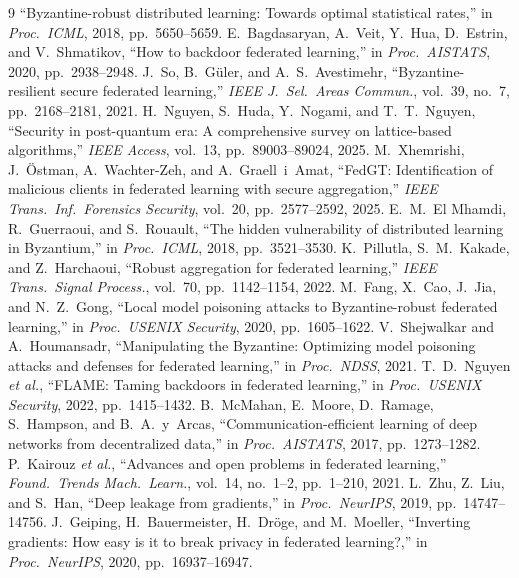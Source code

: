 \documentclass[lettersize,journal]{IEEEtran}
\begin{document}
\begin{thebibliography}{9}
``Byzantine-robust distributed learning: Towards optimal statistical rates,'' in
\emph{Proc.\ ICML}, 2018, pp.\ 5650--5659.
 E.\ Bagdasaryan, A.\ Veit, Y.\ Hua, D.\ Estrin, and
V.\ Shmatikov, ``How to backdoor federated learning,'' in \emph{Proc.\ AISTATS},
2020, pp.\ 2938--2948.
 J.\ So, B.\ G\"uler, and A.\ S.\ Avestimehr,
``Byzantine-resilient secure federated learning,'' \emph{IEEE J.\ Sel.\ Areas
Commun.}, vol.\ 39, no.\ 7, pp.\ 2168--2181, 2021.
 H.\ Nguyen, S.\ Huda, Y.\ Nogami, and T.\ T.\ Nguyen,
``Security in post-quantum era: A comprehensive survey on lattice-based
algorithms,'' \emph{IEEE Access}, vol.\ 13, pp.\ 89003--89024, 2025.
 M.\ Xhemrishi, J.\ \"Ostman, A.\ Wachter-Zeh, and A.\ Graell~i~Amat,
``FedGT: Identification of malicious clients in federated learning with secure
aggregation,'' \emph{IEEE Trans.\ Inf.\ Forensics Security}, vol.\ 20,
pp.\ 2577--2592, 2025.
 E.\ M.\ El Mhamdi, R.\ Guerraoui, and S.\ Rouault, ``The hidden
vulnerability of distributed learning in Byzantium,'' in \emph{Proc.\ ICML}, 2018,
pp.\ 3521--3530.
 K.\ Pillutla, S.\ M.\ Kakade, and Z.\ Harchaoui, ``Robust aggregation
for federated learning,'' \emph{IEEE Trans.\ Signal Process.}, vol.\ 70,
pp.\ 1142--1154, 2022.
 M.\ Fang, X.\ Cao, J.\ Jia, and N.\ Z.\ Gong, ``Local model
poisoning attacks to Byzantine-robust federated learning,'' in \emph{Proc.\ USENIX
Security}, 2020, pp.\ 1605--1622.
 V.\ Shejwalkar and A.\ Houmansadr, ``Manipulating the
Byzantine: Optimizing model poisoning attacks and defenses for federated learning,''
in \emph{Proc.\ NDSS}, 2021.
 T.\ D.\ Nguyen \emph{et al.}, ``FLAME: Taming backdoors in
federated learning,'' in \emph{Proc.\ USENIX Security}, 2022, pp.\ 1415--1432.
 B.\ McMahan, E.\ Moore, D.\ Ramage, S.\ Hampson, and
B.\ A.\ y~Arcas, ``Communication-efficient learning of deep networks from
decentralized data,'' in \emph{Proc.\ AISTATS}, 2017, pp.\ 1273--1282.
 P.\ Kairouz \emph{et al.}, ``Advances and open problems in
federated learning,'' \emph{Found.\ Trends Mach.\ Learn.}, vol.\ 14, no.\ 1--2,
pp.\ 1--210, 2021.
 L.\ Zhu, Z.\ Liu, and S.\ Han, ``Deep leakage from gradients,''
in \emph{Proc.\ NeurIPS}, 2019, pp.\ 14747--14756.
 J.\ Geiping, H.\ Bauermeister, H.\ Dr\"oge, and M.\ Moeller,
``Inverting gradients: How easy is it to break privacy in federated learning?,''
in \emph{Proc.\ NeurIPS}, 2020, pp.\ 16937--16947.

\end{thebibliography}
\end{document}

